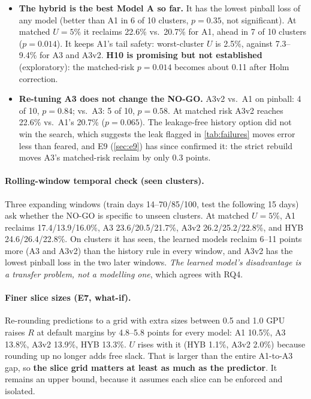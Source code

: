 \begin{itemize}
  \item \textbf{The hybrid is the best Model A so far.} It has the lowest pinball loss of any model (better than A1 in 6 of 10 clusters, $p = 0.35$, not significant). At matched $U = 5\%$ it reclaims 22.6\% vs.\ 20.7\% for A1, ahead in 7 of 10 clusters ($p = 0.014$). It keeps A1's tail safety: worst-cluster $U$ is 2.5\%, against 7.3--9.4\% for A3 and A3v2. \textbf{H10 is promising but not established} (exploratory): the matched-risk $p = 0.014$ becomes about 0.11 after Holm correction.
  \item \textbf{Re-tuning A3 does not change the NO-GO.} A3v2 vs.\ A1 on pinball: 4 of 10, $p = 0.84$; vs.\ A3: 5 of 10, $p = 0.58$. At matched risk A3v2 reaches 22.6\% vs.\ A1's 20.7\% ($p = 0.065$). The leakage-free history option did not win the search, which suggests the leak flagged in \cref{tab:failures} moves error less than feared, and E9 (\cref{sec:e9}) has since confirmed it: the strict rebuild moves A3's matched-risk reclaim by only 0.3 points.
\end{itemize}

\paragraph{Rolling-window temporal check (seen clusters).} Three expanding windows (train days 14--70/85/100, test the following 15 days) ask whether the NO-GO is specific to unseen clusters. At matched $U = 5\%$, A1 reclaims 17.4/13.9/16.0\%, A3 23.6/20.5/21.7\%, A3v2 26.2/25.2/22.8\%, and HYB 24.6/26.4/22.8\%. On clusters it has seen, the learned models reclaim 6--11 points more (A3 and A3v2) than the history rule in every window, and A3v2 has the lowest pinball loss in the two later windows. \emph{The learned model's disadvantage is a transfer problem, not a modelling one}, which agrees with RQ4.

\paragraph{Finer slice sizes (E7, what-if).} Re-rounding predictions to a grid with extra sizes between 0.5 and 1.0 GPU raises $R$ at default margins by 4.8--5.8 points for every model: A1 10.5\%, A3 13.8\%, A3v2 13.9\%, HYB 13.3\%. $U$ rises with it (HYB 1.1\%, A3v2 2.0\%) because rounding up no longer adds free slack. That is larger than the entire A1-to-A3 gap, so \textbf{the slice grid matters at least as much as the predictor}. It remains an upper bound, because it assumes each slice can be enforced and isolated.

